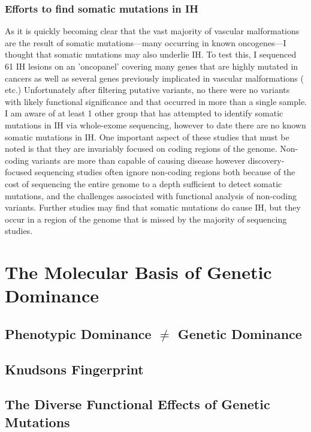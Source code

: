 \subsubsection{Efforts to find somatic mutations in IH}
As it is quickly becoming clear that the vast majority of vascular malformations are the result of somatic mutations—many occurring in known oncogenes—I thought that somatic mutations may also underlie IH. To test this, I sequenced 61 IH lesions on an 'oncopanel' covering many genes that are highly mutated in cancers as well as several genes previously implicated in vascular malformations ( etc.) Unfortunately after filtering putative variants, no there were no variants with likely functional significance and that occurred in more than a single sample. I am aware of at least 1 other group that has attempted to identify somatic mutations in IH via whole-exome sequencing, however to date there are no known somatic mutations in IH. One important aspect of these studies that must be noted is that they are invariably focused on coding regions of the genome. Non-coding variants are more than capable of causing disease however discovery-focused sequencing studies often ignore non-coding regions both because of the cost of sequencing the entire genome to a depth sufficient to detect somatic mutations, and the challenges associated with functional analysis of non-coding variants. Further studies may find that somatic mutations do cause IH, but they occur in a region of the genome that is missed by the majority of sequencing studies. 









\section{The Molecular Basis of Genetic Dominance}
\subsection{Phenotypic Dominance $\neq$ Genetic Dominance}
\subsection{Knudsons Fingerprint}
\subsection{The Diverse Functional Effects of Genetic Mutations}










